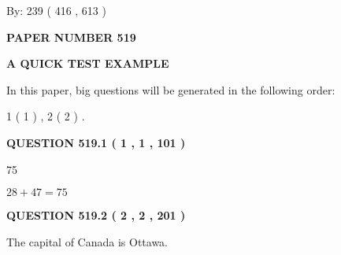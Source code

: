 \documentclass[12pt]{article}
\begin{document}
   
\hspace{1.0in} By: 
 239 ( 416 ,  613 )
   
   
   
   
\newpage 
\setcounter{page}{ 
   519001 } 
   
   
   
   
 {\textbf{ \Large{ PAPER NUMBER  519  }}}
   
   
\vspace{0.2in}
   
   
   
   
   
   
 \vspace{0.2in}
{\LARGE {\textbf{ A QUICK TEST EXAMPLE}}}
   
   
   
\vspace{0.2in}
   
In this paper, big questions will be generated in the following order: 
   
   
   1 ( 1 )
 ,
   2 ( 2 )
 .
  
\vspace{0.2in}
  
{\textbf{\Large{QUESTION
519.1 
 ( 1 , 1 , 101 )
}}}
  
  
 
 
\noindent{}

75
 
 
 
 
\noindent{}

$ %
28 +  %
47=   %
75$
 
 
  
\vspace{0.2in}
  
{\textbf{\Large{QUESTION
519.2 
 ( 2 , 2 , 201 )
}}}
  
  
 
 
\noindent{}
 
 
The capital of Canada is Ottawa.
 
 
 
 
   
   
 \vspace{0.2in}
 
\end{document}
